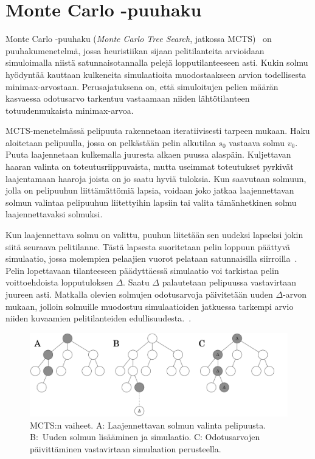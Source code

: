 \documentclass[12pt,finnish]{tktltiki2}
\theoremstyle{definition}
\theoremstyle{remark}
\begin{document}
\section{Monte Carlo -puuhaku}

Monte Carlo -puuhaku (\textit{Monte Carlo Tree Search}, jatkossa MCTS)~\cite{browne} on puuhakumenetelmä, jossa heuristiikan sijaan pelitilanteita arvioidaan simuloimalla niistä satunnaisotannalla pelejä lopputilanteeseen asti. Kukin solmu hyödyntää kauttaan kulkeneita simulaatioita muodostaakseen arvion todellisesta minimax-arvostaan. Perusajatuksena on, että simuloitujen pelien määrän kasvaessa odotusarvo tarkentuu vastaamaan niiden lähtötilanteen totuudenmukaista minimax-arvoa.

MCTS-menetelmässä pelipuuta rakennetaan iteratiivisesti tarpeen mukaan. Haku aloitetaan pelipuulla, jossa on pelkästään pelin alkutilaa $s_0$ vastaava solmu $v_0$. Puuta laajennetaan kulkemalla juuresta alkaen puussa alaspäin. Kuljettavan haaran valinta on toteutusriippuvaista, mutta useimmat toteutukset pyrkivät laajentamaan haaroja joista on jo saatu hyviä tuloksia. Kun saavutaan solmuun, jolla on pelipuuhun liittämättömiä lapsia, voidaan joko jatkaa laajennettavan solmun valintaa pelipuuhun liitettyihin lapsiin tai valita tämänhetkinen solmu laajennettavaksi solmuksi.

Kun laajennettava solmu on valittu, puuhun liitetään sen uudeksi lapseksi jokin siitä seuraava pelitilanne. Tästä lapsesta suoritetaan pelin loppuun päättyvä simulaatio, jossa molempien pelaajien vuorot pelataan satunnaisilla siirroilla~\cite{browne}. Pelin lopettavaan tilanteeseen päädyttäessä simulaatio voi tarkistaa pelin voittoehdoista lopputuloksen $\Delta$. Saatu $\Delta$ palautetaan pelipuussa vastavirtaan juureen asti. Matkalla olevien solmujen odotusarvoja päivitetään uuden $\Delta$-arvon mukaan, jolloin solmuille muodostuu simulaatioiden jatkuessa tarkempi arvio niiden kuvaamien pelitilanteiden edullisuudesta.~\cite{browne}.

\begin{figure}

\includegraphics[width = \textwidth]{basicmcts.png}

\caption{MCTS:n vaiheet. A: Laajennettavan solmun valinta pelipuusta. B:~Uuden solmun lisääminen ja simulaatio. C: Odotusarvojen päivittäminen vastavirtaan simulaation perusteella.}
\end{figure}
\end{document}
